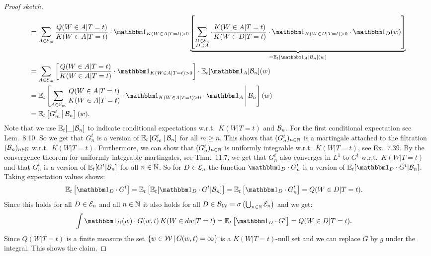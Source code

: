 \begin{Thm}
\begin{proof}[Proof sketch]
\begin{align*}
             &= \sum_{A \in \Ecal_m} \frac{Q(W \in A|T=t)}{K(W \in A|T=t)} \cdot  \I_{K(W \in A|T=t)>0}
             \underbrace{ \lB \sum_{\substack{D \in \Ecal_n\\ D \sni A}}  \cdot\frac{K(W \in A|T=t)}{K(W \in D|T=t)}\cdot  \I_{K(W \in D|T=t)>0}   \cdot \I_D(w)\rB }_{=\E_t[\I_A|\Bcal_n](w)}  \\
             &= \sum_{A \in \Ecal_m} \lB \frac{Q(W \in A|T=t)}{K(W \in A|T=t)}  \cdot  \I_{K(W \in A|T=t)>0} \rB \cdot \E_t[\I_A|\Bcal_n](w) \\ 
             &= \E_t\lB \sum_{A \in \Ecal_m} \frac{Q(W \in A|T=t)}{K(W \in A|T=t)} \cdot  \I_{K(W \in A|T=t)>0} \cdot \I_A \st \Bcal_n\rB(w) \\ 
             &= \E_t\lB G_m^t \st \Bcal_n\rB(w).
    \end{align*}
    Note that we use $\mathbb{E}_t[\_|\mathcal{B}_n]$ to indicate conditional expectations w.r.t.\ $K(W|T=t)$ and $\mathcal{B}_n$.
    For the first conditional expectation see \cite{Kle20} Lem.\ 8.10. 
    So we get that $G_n^t$ is a version of $\mathbb{E}_t\left [ G_m^t \,\middle|\, \mathcal{B}_n\right ]$ for all $m \ge n$.
    This shows that $(G_n^t)_{n \in \mathbb{N}}$ is a martingale attached to the filtration $(\mathcal{B}_n)_{n \in \mathbb{N}}$ w.r.t.\ $K(W|T=t)$.
    Furthermore, we can show that $(G_n^t)_{n \in \mathbb{N}}$ is uniformly integrable w.r.t.\ $K(W|T=t)$, see \cite{Kle20} Ex.\ 7.39.
    By the convergence theorem for uniformly integrable martingales, see \cite{Kle20} Thm.\ 11.7, we get that
    $G_n^t$ also converges in $L^1$ to $G^t$ w.r.t.\ $K(W|T=t)$ and that $G_n^t$ is a version of $\mathbb{E}_t[G^t|\mathcal{B}_n]$ for all $n \in \mathbb{N}$. So for $D \in \mathcal{E}_n$ the function $\I_D \cdot G_n^t$ is a version of $\E_t[\I_D \cdot G^t|\Bcal_n]$.
    Taking expectation values shows:
    \begin{align*}
        \E_t\lB \I_D \cdot G^t  \rB & = \E_t\lB\E_t[ \I_D \cdot G^t|\Bcal_n] \rB  
        = \E_t\lB \I_D \cdot G^t_n  \rB 
        = Q(W \in D|T=t). 
    \end{align*}
    Since this holds for all $D \in \mathcal{E}_n$ and all $n \in \mathbb{N}$ it also holds for all
    $D \in \mathcal{B}_{\mathcal{W}}=\sigma\left ( \bigcup_{n \in \mathbb{N}} \mathcal{E}_n\right )$ and we get:
    \begin{align*}
        \int \I_D(w) \cdot G(w,t) \, K(W \in dw|T=t) &=
        \E_t\lB \I_D \cdot G^t \rB    = Q(W \in D|T=t). 
    \end{align*}
    Since $Q(W|T=t)$ is a finite measure the set $\left \{ w \in \mathcal{W} \,\middle|\, G(w,t) = \infty \right \}$ is a $K(W|T=t)$-null set
    and we can replace $G$ by $g$ under the integral.
    This shows the claim.
  \end{proof}
\end{Thm}

